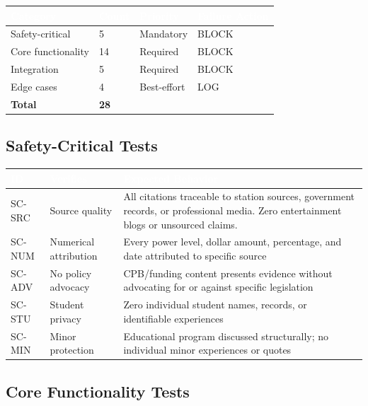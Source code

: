 \documentclass[11pt,letterpaper]{article}
\newcommand{\tableheader}[1]{\textbf{\sffamily\textcolor{white}{#1}}}
\begin{document}
\begin{center}
\begin{tabularx}{\textwidth}{L{3cm}C{1.5cm}C{2cm}C{2cm}}
\toprule
{}
\tableheader{Category} & \tableheader{Count} & \tableheader{Priority} & \tableheader{Failure Action} \\
\midrule
Safety-critical & 5 & Mandatory & BLOCK \\
Core functionality & 14 & Required & BLOCK \\
Integration & 5 & Required & BLOCK \\
Edge cases & 4 & Best-effort & LOG \\
\midrule
\textbf{Total} & \textbf{28} & & \\
\bottomrule
\end{tabularx}
\end{center}

\subsection{Safety-Critical Tests}

\begin{center}
\begin{tabularx}{\textwidth}{C{1.2cm}L{3cm}X}
\toprule
{}
\tableheader{ID} & \tableheader{Verifies} & \tableheader{Expected Behavior} \\
\midrule
SC-SRC & Source quality & All citations traceable to station sources, government records, or professional media. Zero entertainment blogs or unsourced claims. \\
SC-NUM & Numerical attribution & Every power level, dollar amount, percentage, and date attributed to specific source \\
SC-ADV & No policy advocacy & CPB/funding content presents evidence without advocating for or against specific legislation \\
SC-STU & Student privacy & Zero individual student names, records, or identifiable experiences \\
SC-MIN & Minor protection & Educational program discussed structurally; no individual minor experiences or quotes \\
\bottomrule
\end{tabularx}
\end{center}

\subsection{Core Functionality Tests}
\end{document}
